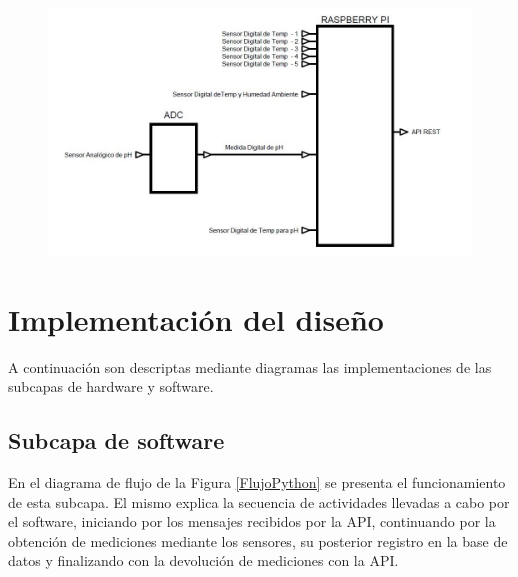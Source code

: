                 \begin{figure}[h]
                    \centering
                    \includegraphics[scale=0.65]{EsquemaDesigndeHardware.jpg}
                    \label{fig:EsquemaHardware}            
                \end{figure} \hfill \break
        
                
                
                
        
    
\section{Implementación del diseño}
    \par A continuación son descriptas mediante diagramas las implementaciones de las subcapas de hardware y software.
  
    \subsection{Subcapa de software}
        \par En el diagrama de flujo de la Figura \ref{FlujoPython} se presenta el funcionamiento de esta subcapa. El mismo explica la secuencia de actividades llevadas a cabo por el software, iniciando por los mensajes recibidos por la API, continuando por la obtención de mediciones mediante los sensores, su posterior registro en la base de datos y finalizando con la devolución de mediciones con la API.

